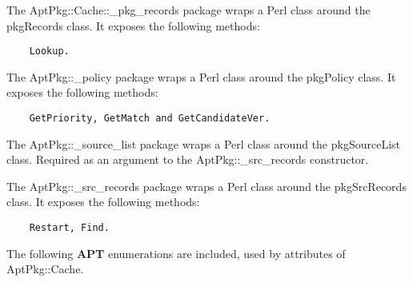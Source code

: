 \documentclass[]{article}
\let\realtextbf=\textbf
\renewcommand{\textbf}[1]{\textcolor{boldcolor}{\realtextbf{#1}}}
\begin{document}
The AptPkg::Cache::\_pkg\_records package wraps a Perl class around the
pkgRecords class. It exposes the following methods:

\begin{verbatim}
    Lookup.
\end{verbatim}


The AptPkg::\_policy package wraps a Perl class around the pkgPolicy
class. It exposes the following methods:

\begin{verbatim}
    GetPriority, GetMatch and GetCandidateVer.
\end{verbatim}


The AptPkg::\_source\_list package wraps a Perl class around the
pkgSourceList class. Required as an argument to the
AptPkg::\_src\_records constructor.


The AptPkg::\_src\_records package wraps a Perl class around the
pkgSrcRecords class. It exposes the following methods:

\begin{verbatim}
    Restart, Find.
\end{verbatim}


The following \textbf{APT} enumerations are included, used by attributes
of AptPkg::Cache.
\end{document}
